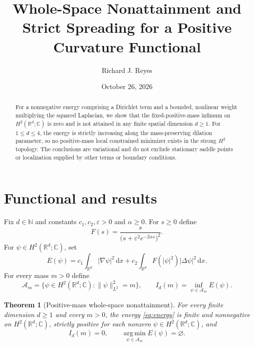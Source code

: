 \documentclass[11pt]{article}
\title{Whole-Space Nonattainment and Strict Spreading for a Positive Curvature Functional}
\author{Richard J. Reyes}
\date{October 26, 2026}
\newtheorem{theorem}{Theorem}
\newcommand{\R}{\mathbb{R}}
\newcommand{\C}{\mathbb{C}}
\newcommand{\A}{\mathcal{A}}
\newcommand{\dd}{\,\mathrm{d}}
\begin{document}
\maketitle

\begin{abstract}
For a nonnegative energy comprising a Dirichlet term and a bounded,
nonlinear weight multiplying the squared Laplacian, we show that the
fixed-positive-mass infimum on $H^2(\R^d;\C)$ is zero and is not attained
in any finite spatial dimension $d\ge 1$. For $1\le d\le4$, the energy
is strictly increasing along the mass-preserving dilation parameter,
so no positive-mass local constrained minimizer exists in the strong
$H^2$ topology. The conclusions are variational and do not exclude
stationary saddle points or localization supplied by other terms or
boundary conditions.
\end{abstract}

\section{Functional and results}
Fix $d\in\mathbb{N}$ and constants $c_1,c_2,\varepsilon>0$ and
$\alpha\ge0$. For $s\ge0$ define
\begin{equation}\label{eq:weight}
 F(s)=\frac{s}{\bigl(s+\varepsilon^2e^{-2\alpha s}\bigr)^2}.
\end{equation}
For $\psi\in H^2(\R^d;\C)$, set
\begin{equation}\label{eq:energy}
 E(\psi)
 =c_1\int_{\R^d}|\nabla\psi|^2\dd x
 +c_2\int_{\R^d}F(|\psi|^2)|\Delta\psi|^2\dd x.
\end{equation}
For every mass $m>0$ define
\begin{equation}\label{eq:mass}
 \A_m=\bigl\{\psi\in H^2(\R^d;\C):\|\psi\|_{L^2}^2=m\bigr\},
 \qquad I_d(m)=\inf_{\psi\in\A_m} E(\psi).
\end{equation}

\begin{theorem}[Positive-mass whole-space nonattainment]\label{thm:global}
For every finite dimension $d\ge1$ and every $m>0$, the energy
\eqref{eq:energy} is finite and nonnegative on $H^2(\R^d;\C)$,
strictly positive for each nonzero $\psi\in H^2(\R^d;\C)$, and
\begin{equation}\label{eq:main}
 \boxed{I_d(m)=0,\qquad
 \operatorname*{arg\,min}_{\psi\in\A_m}E(\psi)=\varnothing.}
\end{equation}
\end{theorem}
\end{document}
